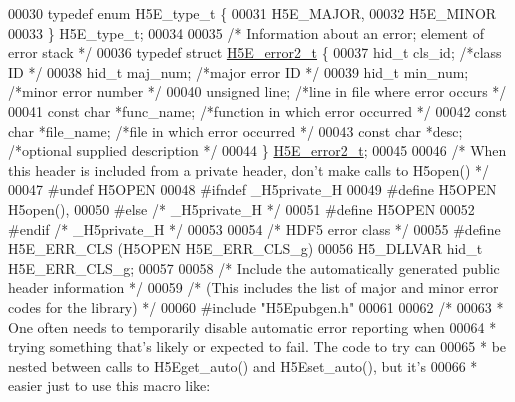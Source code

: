 \begin{DoxyCode}
00030 \textcolor{keyword}{typedef} \textcolor{keyword}{enum} H5E\_type\_t \{
00031     H5E\_MAJOR,
00032     H5E\_MINOR
00033 \} H5E\_type\_t;
00034 
00035 \textcolor{comment}{/* Information about an error; element of error stack */}
00036 \textcolor{keyword}{typedef} \textcolor{keyword}{struct }\hyperlink{struct_h5_e__error2__t}{H5E\_error2\_t} \{
00037     hid\_t       cls\_id;         \textcolor{comment}{/*class ID                           */}
00038     hid\_t       maj\_num;    \textcolor{comment}{/*major error ID             */}
00039     hid\_t       min\_num;    \textcolor{comment}{/*minor error number             */}
00040     \textcolor{keywordtype}{unsigned}    line;       \textcolor{comment}{/*line in file where error occurs    */}
00041     \textcolor{keyword}{const} \textcolor{keywordtype}{char}  *func\_name;     \textcolor{comment}{/*function in which error occurred   */}
00042     \textcolor{keyword}{const} \textcolor{keywordtype}{char}  *file\_name; \textcolor{comment}{/*file in which error occurred       */}
00043     \textcolor{keyword}{const} \textcolor{keywordtype}{char}  *desc;      \textcolor{comment}{/*optional supplied description      */}
00044 \} \hyperlink{struct_h5_e__error2__t}{H5E\_error2\_t};
00045 
00046 \textcolor{comment}{/* When this header is included from a private header, don't make calls to H5open() */}
00047 \textcolor{preprocessor}{#undef H5OPEN}
00048 \textcolor{preprocessor}{#ifndef \_H5private\_H}
00049 \textcolor{preprocessor}{#define H5OPEN          H5open(),}
00050 \textcolor{preprocessor}{#else   }\textcolor{comment}{/* \_H5private\_H */}\textcolor{preprocessor}{}
00051 \textcolor{preprocessor}{#define H5OPEN}
00052 \textcolor{preprocessor}{#endif  }\textcolor{comment}{/* \_H5private\_H */}\textcolor{preprocessor}{}
00053 
00054 \textcolor{comment}{/* HDF5 error class */}
00055 \textcolor{preprocessor}{#define H5E\_ERR\_CLS     (H5OPEN H5E\_ERR\_CLS\_g)}
00056 H5\_DLLVAR hid\_t H5E\_ERR\_CLS\_g;
00057 
00058 \textcolor{comment}{/* Include the automatically generated public header information */}
00059 \textcolor{comment}{/* (This includes the list of major and minor error codes for the library) */}
00060 \textcolor{preprocessor}{#include "H5Epubgen.h"}
00061 
00062 \textcolor{comment}{/*}
00063 \textcolor{comment}{ * One often needs to temporarily disable automatic error reporting when}
00064 \textcolor{comment}{ * trying something that's likely or expected to fail.  The code to try can}
00065 \textcolor{comment}{ * be nested between calls to H5Eget\_auto() and H5Eset\_auto(), but it's}
00066 \textcolor{comment}{ * easier just to use this macro like:}

\end{DoxyCode}
